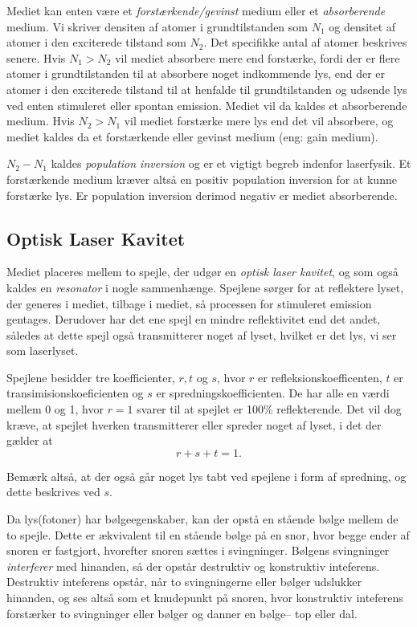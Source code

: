 Mediet kan enten være et \emph{forstærkende/gevinst} medium eller et \emph{absorberende} medium. 
Vi skriver densiten af atomer i grundtilstanden som $N_1$ og densitet af atomer i den exciterede tilstand som $N_2$. Det specifikke antal af atomer beskrives senere. Hvis $N_1>N_2$ vil mediet absorbere mere end forstærke, fordi der er flere atomer i grundtilstanden til at absorbere noget indkommende lys, end der er atomer i den exciterede tilstand til at henfalde til grundtilstanden og udsende lys ved enten stimuleret eller spontan emission. Mediet vil da kaldes et absorberende medium. Hvis $N_2>N_1$ vil mediet forstærke mere lys end det vil absorbere, og mediet kaldes da et forstærkende eller gevinst medium (eng: gain medium). 

$N_2-N_1$ kaldes \emph{population inversion} og er et vigtigt begreb indenfor laserfysik. Et forstærkende medium kræver altså en positiv population inversion for at kunne forstærke lys. Er population inversion derimod negativ er mediet absorberende. 

\subsection{Optisk Laser Kavitet}
Mediet placeres mellem to spejle, der udgør en \emph{optisk laser kavitet}, og som også kaldes en \emph{resonator} i nogle sammenhænge. Spejlene sørger for at reflektere lyset, der generes i mediet, tilbage i mediet, så processen for stimuleret emission gentages. Derudover har det ene spejl en mindre reflektivitet end det andet, således at dette spejl også transmitterer noget af lyset, hvilket er det lys, vi ser som laserlyset. 

Spejlene besidder tre koefficienter, $r, t$ og $s$, hvor $r$ er refleksionskoefficenten, $t$ er transimisionskoeficienten og $s$ er spredningskoefficienten. De har alle en værdi mellem 0 og 1, hvor $r=1$ svarer til at spejlet er 100\% reflekterende. Det vil dog kræve, at spejlet hverken transmitterer eller spreder noget af lyset, i det der gælder at 
\begin{equation}
r + s + t = 1.
\end{equation}

Bemærk altså, at der også går noget lys tabt ved spejlene i form af spredning, og dette beskrives ved $s$. 

Da lys(fotoner) har bølgeegenskaber, kan der opstå en stående bølge mellem de to spejle. Dette er ækvivalent til en stående bølge på en snor, hvor begge ender af snoren er fastgjort, hvorefter snoren sættes i svingninger. Bølgens svingninger \emph{interferer} med hinanden, så der opstår destruktiv og konstruktiv inteferens. Destruktiv inteferens opstår, når to svingningerne eller bølger udslukker hinanden, og ses altså som et knudepunkt på snoren, hvor konstruktiv inteferens forstærker to svingninger eller bølger og danner en bølge-- top eller dal. 

